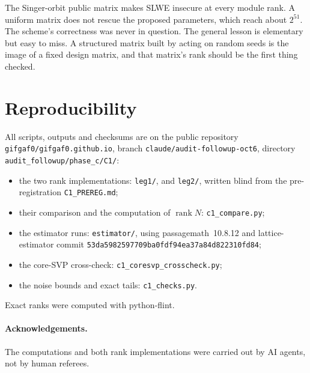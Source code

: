 \documentclass[11pt]{article}
\theoremstyle{remark}
\DeclareMathOperator{\rank}{rank}
\begin{document}
The Singer-orbit public matrix makes SLWE insecure at every module rank. A uniform matrix does not rescue the proposed
parameters, which reach about $2^{51}$. The scheme's correctness was never in question. The general lesson is
elementary but easy to miss. A structured matrix built by acting on random seeds is the image of a fixed design matrix,
and that matrix's rank should be the first thing checked.

\section{Reproducibility}\label{sec:repro}

All scripts, outputs and checksums are on the public repository \texttt{gifgaf0/gifgaf0.github.io}, branch
\texttt{claude/audit-followup-oct6}, directory \texttt{audit\_followup/phase\_c/C1/}:
\begin{itemize}
\item the two rank implementations: \texttt{leg1/}, and \texttt{leg2/}, written blind from the pre-registration
  \texttt{C1\_PREREG.md};
\item their comparison and the computation of $\rank N$: \texttt{c1\_compare.py};
\item the estimator runs: \texttt{estimator/}, using passagemath~10.8.12 and lattice-estimator commit
  \texttt{53da5982597709ba0fdf94ea37a84d822310fd84};
\item the core-SVP cross-check: \texttt{c1\_coresvp\_crosscheck.py};
\item the noise bounds and exact tails: \texttt{c1\_checks.py}.
\end{itemize}
Exact ranks were computed with python-flint.

\paragraph{Acknowledgements.} The computations and both rank implementations were carried out by AI agents, not by
human referees.
\end{document}
